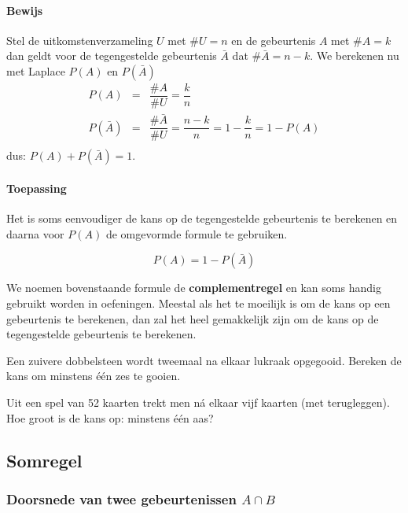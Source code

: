 \documentclass[12pt,twoside]{article}
\begin{document}
\paragraph*{Bewijs} Stel de uitkomstenverzameling $U$ met $\#U = n$ en de gebeurtenis $A$ met $\#A = k$ dan
geldt voor de tegengestelde gebeurtenis $\bar{A}$ dat $\#\bar{A} = n - k$.
We berekenen nu met Laplace $P(A)$ en $P(\bar{A})$
\begin{eqnarray*}
  P(A)&=&\dfrac{\#A}{\#U}=\dfrac{k}{n}\\
  P(\bar{A})&=&\dfrac{\#\bar{A}}{\#U}=\dfrac{n-k}{n}=1-\dfrac{k}{n}=1-P(A)\\
\end{eqnarray*}
dus: $P(A)+P(\bar{A})=1$.

\paragraph*{Toepassing}
Het is soms eenvoudiger de kans op de tegengestelde gebeurtenis te berekenen en
daarna voor $P(A)$ de omgevormde formule te gebruiken.\\
\begin{mdframed}
$$P(A)=1-P(\bar{A})$$
\end{mdframed}

We noemen bovenstaande formule de {\bf complementregel} en kan soms handig gebruikt worden in oefeningen. Meestal als het te moeilijk is om de kans op een gebeurtenis te berekenen, dan zal het heel gemakkelijk zijn om de kans op de tegengestelde gebeurtenis te berekenen.

\begin{oefening}
Een zuivere dobbelsteen wordt tweemaal na elkaar lukraak opgegooid. Bereken de
kans om minstens één zes te gooien.
\end{oefening}

\begin{oefening}
Uit een spel van 52 kaarten trekt men ná elkaar vijf kaarten (met terugleggen). Hoe
groot is de kans op: minstens één aas?
\end{oefening}

\pagebreak

\subsection{Somregel}

\subsubsection{Doorsnede van twee gebeurtenissen $A\cap B$}
\end{document}
